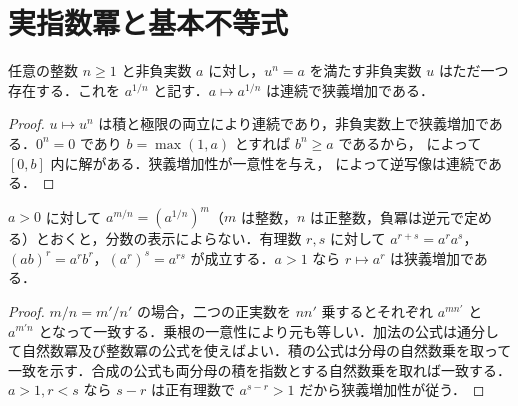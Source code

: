 \section{実指数冪と基本不等式}
\begin{prop}[非負実数の自然数乗根]
任意の整数 $n\geq1$ と非負実数 $a$ に対し，$u^n=a$ を満たす非負実数 $u$ はただ一つ存在する．これを $a^{1/n}$ と記す．$a\mapsto a^{1/n}$ は連続で狭義増加である．
\end{prop}
\begin{proof}
$u\mapsto u^n$ は積と極限の両立により連続であり，非負実数上で狭義増加である．$0^n=0$ であり $b=\max(1,a)$ とすれば $b^n\geq a$ であるから， によって $[0,b]$ 内に解がある．狭義増加性が一意性を与え， によって逆写像は連続である．
\end{proof}
\begin{prop}[正実数の有理数冪]
$a>0$ に対して $a^{m/n}=(a^{1/n})^m$（$m$ は整数，$n$ は正整数，負冪は逆元で定める）とおくと，分数の表示によらない．有理数 $r,s$ に対して $a^{r+s}=a^ra^s$，$(ab)^r=a^rb^r$，$(a^r)^s=a^{rs}$ が成立する．$a>1$ なら $r\mapsto a^r$ は狭義増加である．
\end{prop}
\begin{proof}
$m/n=m'/n'$ の場合，二つの正実数を $nn'$ 乗するとそれぞれ $a^{mn'}$ と $a^{m'n}$ となって一致する．乗根の一意性により元も等しい．加法の公式は通分して自然数冪及び整数冪の公式を使えばよい．積の公式は分母の自然数乗を取って一致を示す．合成の公式も両分母の積を指数とする自然数乗を取れば一致する．$a>1,r<s$ なら $s-r$ は正有理数で $a^{s-r}>1$ だから狭義増加性が従う．
\end{proof}
